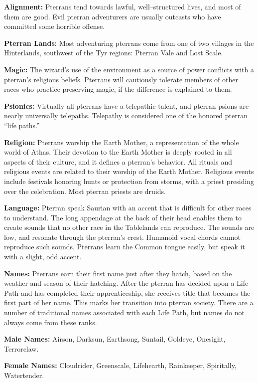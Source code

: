 \documentclass[10pt,a4paper,twocolumn]{d20}
\begin{document}
{\textbf{Alignment:} Pterrans tend towards lawful, well–structured lives, and most of them are good. Evil pterran adventurers are usually outcasts who have committed some horrible offense.

\textbf{Pterran Lands:} Most adventuring pterrans come from one of two villages in the Hinterlands, southwest of the Tyr regions: Pterran Vale and Lost Scale.

\textbf{Magic:} The wizard’s use of the environment as a source of power conflicts with a pterran’s religious beliefs. Pterrans will cautiously tolerate members of other races who practice preserving magic, if the difference is explained to them.

\textbf{Psionics:} Virtually all pterrans have a telepathic talent, and pterran psions are nearly universally telepaths. Telepathy is considered one of the honored pterran ``life paths.''

\textbf{Religion:} Pterrans worship the Earth Mother, a representation of the whole world of Athas. Their devotion to the Earth Mother is deeply rooted in all aspects of their culture, and it defines a pterran’s behavior. All rituals and religious events are related to their worship of the Earth Mother. Religious events include festivals honoring hunts or protection from storms, with a priest presiding over the celebration. Most pterran priests are druids.

\textbf{Language:} Pterran speak Saurian with an accent that is difficult for other races to understand. The long appendage at the back of their head enables them to create sounds that no other race in the Tablelands can reproduce. The sounds are low, and resonate through the pterran’s crest. Humanoid vocal chords cannot reproduce such sounds. Pterrans learn the Common tongue easily, but speak it with a slight, odd accent.

\textbf{Names:} Pterrans earn their first name just after they hatch, based on the weather and season of their hatching. After the pterran has decided upon a Life Path and has completed their apprenticeship, she receives title that becomes the first part of her name. This marks her transition into pterran society. There are a number of traditional names associated with each Life Path, but names do not always come from these ranks.

\textbf{Male Names:} Airson, Darksun, Earthsong, Suntail, Goldeye, Onesight, Terrorclaw.

\textbf{Female Names:} Cloudrider, Greenscale, Lifehearth, Rainkeeper, Spiritally, Watertender.

}
\end{document}
